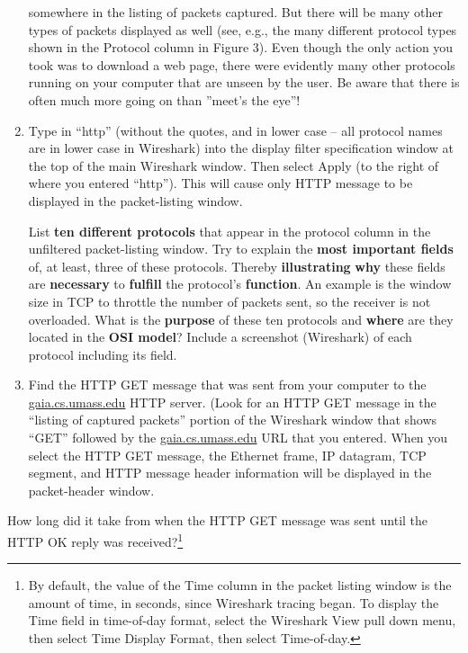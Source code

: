\documentclass[11pt,a4paper]{article}
\begin{document}
\begin{enumerate}
    somewhere in the listing of packets captured. But there will be many other types
    of packets displayed as well (see, e.g., the many different protocol types shown in
    the Protocol column in Figure 3). Even though the only action you took was to
    download a web page, there were evidently many other protocols running on your
    computer that are unseen by the user. Be aware that there is often much more going on than ''meet’s the eye''!
    \item Type in ``http'' (without the quotes, and in lower case – all protocol names are in
    lower case in Wireshark) into the display filter specification window at the top of
    the main Wireshark window. Then select Apply (to the right of where you entered
    ``http''). This will cause only HTTP message to be displayed in the packet-listing
    window.
    
    \begin{question}
        List \textbf{ten different protocols} that appear in the protocol column in the unfiltered packet-listing window. Try to explain the \textbf{most important fields} of, at least, three of these protocols. Thereby \textbf{illustrating} \textbf{why} these fields are \textbf{necessary} to \textbf{fulfill} the protocol's \textbf{function}. An example is the window size in TCP to throttle the number of packets sent, so the receiver is not overloaded.
        What is the \textbf{purpose} of these ten protocols and \textbf{where} are they located in the \textbf{OSI model}? Include a screenshot (Wireshark) of each protocol including its field.
    \end{question}%
    
    
    
    
    \item Find the HTTP GET message that was sent from your computer to the
    \url{gaia.cs.umass.edu} HTTP server. (Look for an HTTP GET message in the ``listing
    of captured packets'' portion of the Wireshark window  that shows
    ``GET'' followed by the \url{gaia.cs.umass.edu} URL that you entered. When you
    select the HTTP GET message, the Ethernet frame, IP datagram, TCP segment,
    and HTTP message header information will be displayed in the packet-header
    window. 
\end{enumerate}

\begin{question}
    How long did it take from when the HTTP GET message was sent until the HTTP
	OK reply was received?\footnote{By default, the value of the Time column in the packet listing
		window is the amount of time, in seconds, since Wireshark tracing began.
		To display the Time field in time-of-day format, select the Wireshark View pull
		down menu, then select Time Display Format, then select Time-of-day.}
\end{question}
\end{document}
